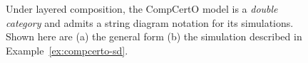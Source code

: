 \documentclass[acmsmall,screen,review,anonymous]{acmart}
\newcommand{\kw}[1]{\ensuremath{ \mathsf{#1} }}
\begin{document}
\begin{figure}
{}
  \caption{
    Under layered composition,
    the CompCertO model is a \emph{double category}
    and admits a string diagram notation for its simulations.
    Shown here are (a) the general form
    (b) the simulation described in Example~\ref{ex:compcerto-sd}.}
  \label{fig:compcerto}
\end{figure}
\end{document}
